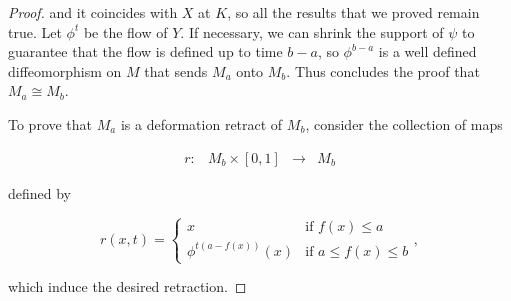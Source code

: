 \begin{proof}
and it coincides with $X$ at $K$, so all the results that we proved remain true. Let $\phi^t$ be the flow of $Y$. If necessary, we can shrink the support of $\psi$ to guarantee that the flow is defined up to time $b-a$, so $\phi^{b-a}$ is a well defined diffeomorphism on $M$ that sends $M_a$ onto $M_b$. Thus concludes the proof that $M_a \cong M_b$.

To prove that $M_a$ is a deformation retract of $M_b$, consider the collection of maps

$$\begin{array}{rccc} r : & M_b \times [0,1] & \longrightarrow & M_b \end{array}$$

defined by

$$r(x,t) = \left\{ \begin{array}{ll} x & \text{if } f(x) \leq a \\ \phi^{t(a-f(x))}(x) & \text{if } a \leq f(x) \leq b \end{array} \right. ,$$

which induce the desired retraction.
\end{proof}
